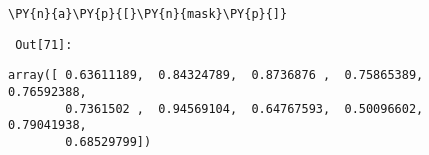 
{\par%
\vspace{-1\baselineskip}%
}%
\begin{notebookcell}[71]%
\begin{addmargin}[\cellleftmargin]{0em}%
{\smaller%
\par%
%
\vspace{-1\smallerfontscale}%
\begin{Verbatim}[commandchars=\\\{\}]
\PY{n}{a}\PY{p}{[}\PY{n}{mask}\PY{p}{]}
\end{Verbatim}
%
\par%
\vspace{-1\smallerfontscale}}%
\end{addmargin}
\end{notebookcell}

\par\vspace{1\smallerfontscale}%
    
        {\par%
        \vspace{-1\smallerfontscale}%
        \noindent%
        \begin{minipage}{\cellleftmargin}%
    \hfill%
    {\smaller%
    \tt%
    \color{nbframe-out-prompt}%
    Out[71]:}%
    \hspace{\inputpadding}%
    \hspace{0em}%
    \hspace{3pt}%
    \end{minipage}%
        }%
    \begin{addmargin}[\cellleftmargin]{0em}%
    {\smaller%
    \vspace{-1\smallerfontscale}%
    
    
    
    \begin{verbatim}
array([ 0.63611189,  0.84324789,  0.8736876 ,  0.75865389,  0.76592388,
        0.7361502 ,  0.94569104,  0.64767593,  0.50096602,  0.79041938,
        0.68529799])
    \end{verbatim}

    
}%
    \end{addmargin}%

